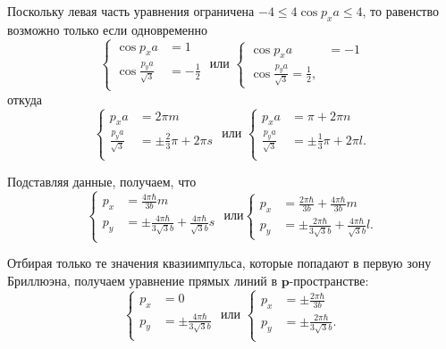 \documentclass[a4paper]{article}
\begin{document}
\begin{sol}
Поскольку левая часть уравнения ограничена $-4 \le 
4 \cos p_x a\le 4$, то равенство возможно
только если одновременно
\[
\left\{
\begin{aligned}
\cos p_x a &= 1 \\
\cos \frac{p_y a}{\sqrt{3} }&= -\frac{1}{2} \\
\end{aligned}
\right.
\text{ или }
\left\{
\begin{aligned}
\cos p_x a&= -1 \\
\cos \frac{p_y a}{\sqrt{3} }=\frac{1}{2},
\end{aligned}
\right.
\]
откуда
\[
\left\{
\begin{aligned}
p_x a&= 2 \pi m \\
\frac{p_y a}{\sqrt{3} }&= \pm \frac{2}{3}
\pi+2 \pi s\\
\end{aligned}
\right.
\text{ или }
\left\{
\begin{aligned}
	p_x a&= \pi +2\pi n\\
	\frac{p_y a}{\sqrt{3} }&=  \pm \frac{1}{3}
	\pi +2 \pi l.\\
\end{aligned}
\right.
\] 

Подставляя данные, получаем, что
\[
\left\{
\begin{aligned}
p_x &= \frac{4\pi \hbar }{3b}m \\
p_y &= \pm \frac{4\pi \hbar }{3 \sqrt{3} b}+
\frac{4\pi \hbar }{\sqrt{3} b}s\\
\end{aligned}
\right.
\text{ или}
\left\{
\begin{aligned}
	p_x&= \frac{2\pi \hbar }{3b}+ \frac{4\pi \hbar }{3b}
m\\
	p_y &= \pm  \frac{2\pi \hbar }{3\sqrt{3} b}+
\frac{4\pi \hbar }{\sqrt{3} b}l.
\end{aligned}
\right.
\] 

Отбирая только те значения квазиимпульса, которые
попадают в первую зону Бриллюэна, получаем уравнение
прямых линий в $\mathbf{p}$-пространстве:
 \[
\left\{
\begin{aligned}
p_x&= 0 \\
p_y &= \pm \frac{4\pi \hbar }{3\sqrt{3} b} \\
\end{aligned}
\right.
\text{ или }
\left\{
\begin{aligned}
p_x &= \pm  \frac{2\pi \hbar }{3b} \\
p_y &= \pm \frac{2\pi \hbar }{3\sqrt{3} b}. \\
\end{aligned}
\right.
\] 


\end{sol}
\end{document}
